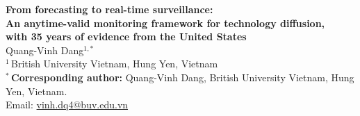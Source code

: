 \documentclass[12pt]{article}
\begin{document}
\begin{center}
{\Large\bfseries From forecasting to real-time surveillance:\\[2pt]
An anytime-valid monitoring framework for technology diffusion,\\[2pt]
with 35 years of evidence from the United States}\\[24pt]
{\large Quang-Vinh Dang$^{1,*}$}\\[10pt]
$^{1}$\,British University Vietnam, Hung Yen, Vietnam\\[6pt]
$^{*}$\,\textbf{Corresponding author:} Quang-Vinh Dang, British University Vietnam, Hung Yen, Vietnam.\\
Email: \href{mailto:vinh.dq4@buv.edu.vn}{vinh.dq4@buv.edu.vn}
\end{center}
\end{document}

